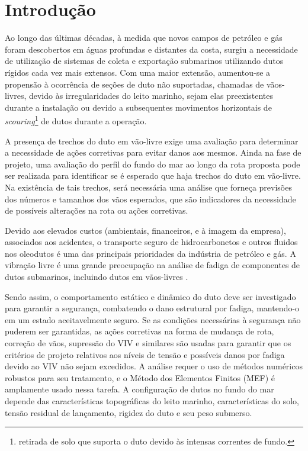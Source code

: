 \chapter{Introdução}


Ao longo das últimas décadas, à medida que novos campos de petróleo e gás foram descobertos em águas profundas e distantes da costa, surgiu a necessidade de utilização de sistemas de coleta e exportação submarinos utilizando dutos rígidos cada vez mais extensos.
Com uma maior extensão, aumentou-se a propensão à ocorrência de seções de duto não suportadas, chamadas de vãos-livres, devido às irregularidades do leito marinho, sejam elas preexistentes durante a instalação ou devido a subsequentes movimentos horizontais de \textit{scouring}\footnote{retirada de solo que suporta o duto devido às intensas correntes de fundo.} de dutos durante a operação.

A presença de trechos do duto em vão-livre exige uma avaliação para determinar a necessidade de ações corretivas para evitar danos aos mesmos.
Ainda na fase de projeto, uma avaliação do perfil do fundo do mar ao longo da rota proposta pode ser realizada para identificar se é esperado que haja trechos do duto em vão-livre.
Na existência de tais trechos, será necessária uma análise que forneça previsões dos números e tamanhos dos vãos esperados, que são indicadores da necessidade de possíveis alterações na rota ou ações corretivas.

Devido aos elevados custos (ambientais, financeiros, e à imagem da empresa), associados aos acidentes, o transporte seguro de hidrocarbonetos e outros fluidos nos oleodutos é uma das principais prioridades da indústria de petróleo e gás.
A vibração livre é uma grande preocupação na análise de fadiga de componentes de dutos submarinos, incluindo dutos em vãos-livres \cite{Gamino2013}.

Sendo assim, o comportamento estático e dinâmico do duto deve ser investigado para garantir a segurança, combatendo o dano estrutural por fadiga, mantendo-o em um estado aceitavelmente seguro.
Se as condições necessárias à segurança não puderem ser garantidas, as ações corretivas na forma de mudança de rota, correção de vãos, supressão do VIV e similares são usadas para garantir que os critérios de projeto relativos aos níveis de tensão e possíveis danos por fadiga devido ao VIV não sejam excedidos.
A análise requer o uso de métodos numéricos robustos para seu tratamento, e o Método dos Elementos Finitos (MEF) é amplamente usado nessa tarefa.
A configuração de dutos no fundo do mar depende das características topográficas do leito marinho, características do solo, tensão residual de lançamento, rigidez do duto e seu peso submerso.

